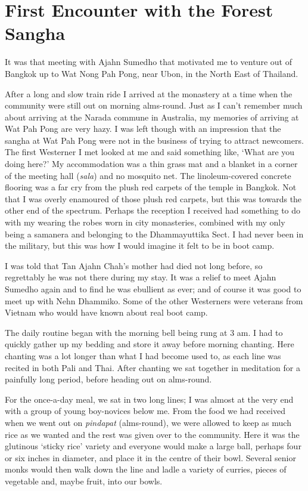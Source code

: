 \chapter{First Encounter with the Forest Sangha}

It was that meeting with Ajahn Sumedho that motivated me to venture out
of Bangkok up to Wat Nong Pah Pong, near Ubon, in the North East of
Thailand.

After a long and slow train ride I arrived at the monastery at a time
when the community were still out on morning alms-round. Just as I can't
remember much about arriving at the Narada commune in Australia, my
memories of arriving at Wat Pah Pong are very hazy. I was left though
with an impression that the sangha at Wat Pah Pong were not in the
business of trying to attract newcomers. The first Westerner I met
looked at me and said something like, `What are you doing here?' My
accommodation was a thin grass mat and a blanket in a corner of the
meeting hall (\emph{sala}) and no mosquito net. The linoleum-covered
concrete flooring was a far cry from the plush red carpets of the temple
in Bangkok. Not that I was overly enamoured of those plush red carpets,
but this was towards the other end of the spectrum. Perhaps the
reception I received had something to do with my wearing the robes worn
in city monasteries, combined with my only being a samanera and
belonging to the Dhammayuttika Sect. I had never been in the military, but
this was how I would imagine it felt to be in boot camp.

I was told that Tan Ajahn Chah's mother had died not long before, so
regrettably he was not there during my stay. It was a relief to meet
Ajahn Sumedho again and to find he was ebullient as ever; and of course it was
good to meet up with Nehn Dhammiko. Some of the other Westerners were
veterans from Vietnam who would have known about real boot camp.

The daily routine began with the morning bell being rung at 3 am. I had
to quickly gather up my bedding and store it away before morning
chanting. Here chanting was a lot longer than what I had become used to,
as each line was recited in both Pali and Thai. After chanting we sat
together in meditation for a painfully long period, before heading out
on alms-round.

For the once-a-day meal, we sat in two long lines; I was almost at the
very end with a group of young boy-novices below me. From the food we
had received when we went out on \emph{pindapat} (alms-round), we were
allowed to keep as much rice as we wanted and the rest was given over to
the community. Here it was the glutinous `sticky rice' variety and
everyone would make a large ball, perhaps four or six inches in
diameter, and place it in the centre of their bowl. Several senior monks
would then walk down the line and ladle a variety of curries, pieces of
vegetable and, maybe fruit, into our bowls.

